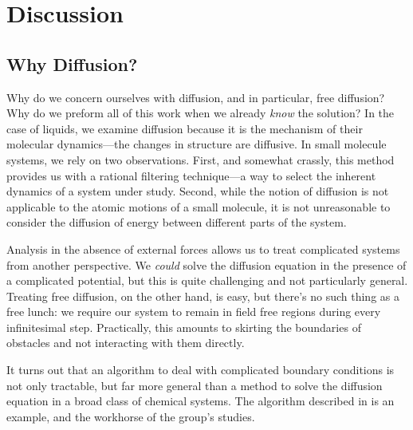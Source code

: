 \documentclass[letterpaper,12pt]{article}
\begin{document}
\section*{Discussion}
\subsection*{Why Diffusion?}
Why do we concern ourselves with diffusion, and in particular, free diffusion? Why do we preform all of this work when we already \emph{know} the solution? In the case of liquids, we examine diffusion because it is the mechanism of their molecular dynamics---the changes in structure are diffusive. In small molecule systems, we rely on two observations. First, and somewhat crassly, this method provides us with a rational filtering technique---a way to select the inherent dynamics of a system under study. Second, while the notion of diffusion is not applicable to the atomic motions of a small molecule, it is not unreasonable to consider the diffusion of energy between different parts of the system.

Analysis in the absence of external forces allows us to treat complicated systems from another perspective. We \emph{could} solve the diffusion equation in the presence of a complicated potential, but this is quite challenging and not particularly general. Treating free diffusion, on the other hand, is easy, but there's no such thing as a free lunch: we require our system to remain in field free regions during every infinitesimal step. Practically, this amounts to skirting the boundaries of obstacles and not interacting with them directly.

It turns out that an algorithm to deal with complicated boundary conditions is not only tractable, but far more general than a method to solve the diffusion equation in a broad class of chemical systems. The algorithm described in \cite{wang:2007:geodesics} is an example, and the workhorse of the group's studies.
\end{document}
